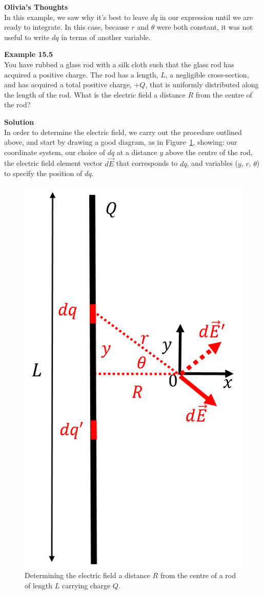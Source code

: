 \begin{framed}
\textbf{Olivia's Thoughts}\\
In this example, we saw why it's best to leave $dq$ in our expression until we are ready to integrate. In this case, because $r$ and $\theta$ were both constant, it was not useful to write $dq$ in terms of another variable.
\end{framed}

\begin{framed}
\textbf{Example 15.5}\\
You have rubbed a glass rod with a silk cloth such that the glass rod has acquired a positive charge. The rod has a length, $L$, a negligible cross-section, and has acquired a total positive charge, $+Q$, that is uniformly distributed along the length of the rod. What is the electric field a distance $R$ from the centre of the rod?

\begin{framed}
\textbf{Solution}\\
In order to determine the electric field, we carry out the procedure outlined above, and start by drawing a good diagram, as in Figure~\ref{fig:chargesfields:finiteline}, showing: our coordinate system, our choice of $dq$ at a distance $y$ above the centre of the rod, the electric field element vector $d\vec E$ that corresponds to $dq$, and variables ($y$, $r$, $\theta$) to specify the position of $dq$.

\begin{figure}[!htbp]
\centering
\includegraphics[width=0.3\linewidth]{files/finiteline-4685490417c1a722b87b010361357eb7.png}
\caption[]{Determining the electric field a distance $R$ from the centre of a rod of length $L$ carrying charge $Q$.}
\label{fig:chargesfields:finiteline}
\end{figure}


\end{framed}
\end{framed}
